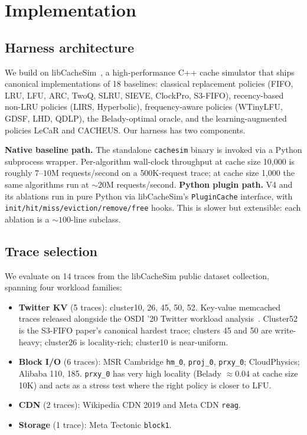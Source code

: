 \documentclass[letterpaper,twocolumn,10pt]{article}
\begin{document}
\section{Implementation}
\label{sec:impl}
 
\subsection{Harness architecture}

We build on libCacheSim~\cite{libcachesim}, a high-performance C++ cache simulator that ships canonical implementations of 18 baselines: classical replacement policies (FIFO, LRU, LFU, ARC, TwoQ, SLRU, SIEVE, ClockPro, S3-FIFO), recency-based non-LRU policies (LIRS, Hyperbolic), frequency-aware policies (WTinyLFU, GDSF, LHD, QDLP), the Belady-optimal oracle, and the learning-augmented policies LeCaR and CACHEUS. Our harness has two components.

\textbf{Native baseline path.} The standalone \texttt{cachesim} binary is invoked via a Python subprocess wrapper. Per-algorithm wall-clock throughput at cache size 10{,}000 is roughly $7$--$10$M requests/second on a 500K-request trace; at cache size 1{,}000 the same algorithms run at $\sim$20M requests/second. 
\textbf{Python plugin path.} V4 and its ablations run in pure
Python via libCacheSim's \texttt{PluginCache} interface, with
\texttt{init/hit/miss/eviction/remove/free} hooks. This is
slower but extensible: each ablation is a $\sim 100$-line
subclass.
 
\subsection{Trace selection}
 
We evaluate on 14 traces from the libCacheSim public dataset
collection, spanning four workload families:
 
\begin{itemize}
\item \textbf{Twitter KV} (5 traces): cluster10, 26, 45, 50, 52.
  Key-value memcached traces released alongside the OSDI '20 Twitter
  workload analysis~\cite{twittertraces}. Cluster52 is the
  S3-FIFO paper's canonical hardest trace; clusters 45 and 50 are
  write-heavy; cluster26 is locality-rich; cluster10 is near-uniform.
\item \textbf{Block I/O} (6 traces): MSR Cambridge \texttt{hm\_0},
  \texttt{proj\_0}, \texttt{prxy\_0}; CloudPhysics; Alibaba 110, 185.
  \texttt{prxy\_0} has very high locality (Belady $\approx 0.04$ at
  cache size 10K) and acts as a stress test where the right policy
  is closer to LFU.
\item \textbf{CDN} (2 traces): Wikipedia CDN 2019 and Meta CDN
  \texttt{reag}.
\item \textbf{Storage} (1 trace): Meta Tectonic \texttt{block1}.
\end{itemize}
 
\end{document}
